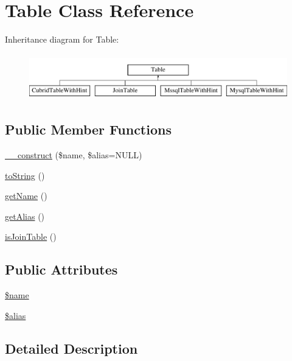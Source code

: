 \hypertarget{classTable}{\section{Table Class Reference}
\label{classTable}
}
Inheritance diagram for Table\-:\begin{figure}[H]
\begin{center}
\leavevmode
\includegraphics[height=2.000000cm]{classTable}
\end{center}
\end{figure}
\subsection*{Public Member Functions}
\begin{DoxyCompactItemize}
\item 
\hyperlink{classTable_a4569b7ece83fb7086a52e91d7b8fb904}{\-\_\-\-\_\-construct} (\$name, \$alias=N\-U\-L\-L)
\item 
\hyperlink{classTable_a19994c4700a5cf54951216f7782c08d0}{to\-String} ()
\item 
\hyperlink{classTable_a8e2ad8a066449c8fedf8f3a9192db355}{get\-Name} ()
\item 
\hyperlink{classTable_ad278f4d13845b8b52a4496f6c5f0e47d}{get\-Alias} ()
\item 
\hyperlink{classTable_a4d82b6895fe7a4af2ff50dddc955d075}{is\-Join\-Table} ()
\end{DoxyCompactItemize}
\subsection*{Public Attributes}
\begin{DoxyCompactItemize}
\item 
\hyperlink{classTable_a7c7f5d88257a02dd1fbeee22a77c7f39}{\$name}
\item 
\hyperlink{classTable_ac4290933d902bdb3b69a32ebe964df02}{\$alias}
\end{DoxyCompactItemize}


\subsection{Detailed Description}


